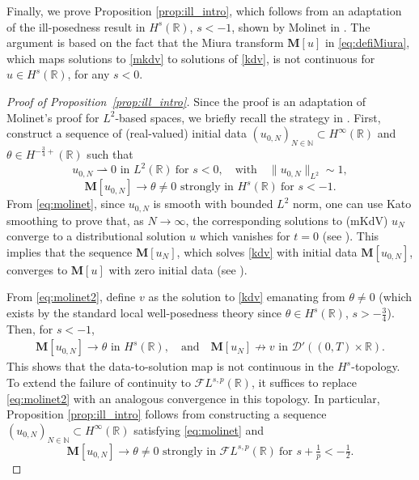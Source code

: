 \documentclass[a4paper,
11pt,  reqno]{amsart}
\newcommand{\5}{\textup{V}}
\newcommand{\FL}{\mathcal{F} L}
\theoremstyle{remark}
\newcommand{\R}{\mathbb{R}}
\newcommand{\MMb}{\mathbf{M}}
\newcommand{\N}{\mathbb{N}}
\numberwithin{equation}{section}
\numberwithin{theorem}{section}
\begin{document}
Finally, we prove Proposition \ref{prop:ill_intro}, which follows from an adaptation of the ill-posedness result in $H^s(\R)$, $s<-1$, shown by Molinet in \cite{Molinet_ill_line}. The argument is based on the fact that the Miura transform $\MMb[u]$ in \eqref{eq:defiMiura}, which 
maps solutions to \eqref{mkdv} to solutions of \eqref{kdv},
is not continuous for $u\in H^s(\R)$, for any $s<0$.




\begin{proof}[Proof of Proposition~\ref{prop:ill_intro}]


Since the proof is an adaptation of Molinet's proof for $L^2$-based spaces, we briefly recall the strategy in \cite{Molinet_ill_line}. 
 First, construct a sequence of (real-valued) initial data $(u_{0,N})_{N\in\N}\subset H^\infty(\R)$ and $\theta\in H^{-\frac34+}(\R)$ such that
\begin{equation}\label{eq:molinet}
	u_{0,N}\rightharpoonup 0 \mbox{ in }L^2(\R)\ \text{for } s<0,\quad \text{with} 
    \quad \|u_{0,N}\|_{L^2}\sim 1,
\end{equation}
\begin{equation}\label{eq:molinet2}
 \MMb[u_{0,N}] \to \theta\neq 0  \mbox{ strongly in }H^{s}(\R)
 \ \text{for }
 s<-1.
\end{equation}
From \eqref{eq:molinet}, since $u_{0,N}$ is smooth with bounded $L^2$ norm, one can use Kato smoothing to prove that, as $N\to \infty$, the corresponding solutions to (mKdV) $u_N$ converge to a distributional solution $u$ which vanishes for $t=0$ (see \cite[Proposition 2.1]{Molinet_ill_line}). This implies that the sequence $\MMb[u_N]$, which solves \eqref{kdv} with initial data $\MMb[u_{0,N}]$, converges to $\MMb[u]$ with zero initial data (see \cite[Proposition 2.2]{Molinet_ill_line}). 

From \eqref{eq:molinet2}, define $v$ as the solution to \eqref{kdv} emanating from $\theta\neq 0$ (which exists by the standard local well-posedness theory since $\theta\in H^s(\R)$, $s>-\frac34$). 
Then, for $s<-1$,
\begin{align}
\MMb[u_{0, N}] \to \theta \mbox{ in }H^s(\R), 
\quad
\text{and}
\quad
\MMb[u_N] \not\to v \mbox{ in  }\mathcal{D}'((0,T)\times \R).
\end{align}
This shows that the data-to-solution map is not continuous in the $H^s$-topology.
To extend the failure of continuity to $\FL^{s,p}(\R)$, it suffices to replace \eqref{eq:molinet2} with an analogous convergence in this topology.
In particular, Proposition \ref{prop:ill_intro} follows from constructing a sequence $(u_{0,N})_{N\in \N} \subset H^\infty(\R)$ satisfying \eqref{eq:molinet} and 
\begin{equation}\label{eq:molinet2_v2}
 \MMb[u_{0,N}] \to \theta\neq 0 \mbox{ strongly in }\mathcal{F}L^{s,p}(\R) \ \text{for } s+\tfrac1p<-\tfrac12.
\end{equation}





\end{proof}
\end{document}
